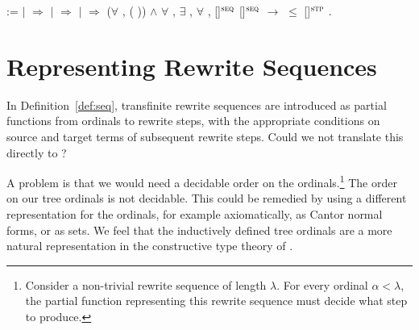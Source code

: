 \begin{singlespace}
\begin{coqdoccode}
:=\coqdoceol
\coqdocindent{1.00em}
 \coqdocvariable{$\varphi$} \coqdoceol
\coqdocindent{1.00em}
\ensuremath{|} 
\coqdocvar{\_}          \ensuremath{\Rightarrow}
\coqdoceol
\coqdocindent{1.00em}
\ensuremath{|} 
\coqdocvar{\_} \coqdocvar{\_} \coqdocvar{$\psi$} \coqdocvar{\_}
\coqdocvar{\_} \ensuremath{\Rightarrow}
\coqdocvariable{$\psi$}\coqdoceol
\coqdocindent{1.00em}
\ensuremath{|} 
\coqdocvar{\_} \coqdocvar{\_}  
\coqdocvar{\_}  \ensuremath{\Rightarrow}
(\ensuremath{\forall} ,
( )) \ensuremath{\land}\coqdoceol
\coqdocindent{2.00em}
\ensuremath{\forall} , \ensuremath{\exists}
\coqdocvar{$\iota$}, \ensuremath{\forall} \coqdocvar{$\kappa$},\coqdoceol
\coqdocindent{3.00em}
\coqdocvariable{$\varphi$}[\coqdocvariable{$\iota$}]$^\textsc{seq}$
\coqdocvariable{$\varphi$}[\coqdocvariable{$\kappa$}]$^\textsc{seq}$
\ensuremath{\rightarrow}
 $\le$
\coqdocvariable{$\varphi$}[\coqdocvariable{$\kappa$}]$^\textsc{stp}$\coqdoceol
\coqdocindent{1.00em}
.\coqdoceol
\end{coqdoccode}
\end{singlespace}



\section{Representing Rewrite Sequences}

In Definition~\ref{def:seq}, transfinite rewrite sequences are
introduced as partial functions from ordinals to rewrite steps, with
the appropriate conditions on source and target terms of subsequent
rewrite steps. Could we not translate this directly to \Coq?

A problem is that we would need a decidable order on the
ordinals.\footnote{Consider a non-trivial rewrite sequence of length
  $\lambda$. For every ordinal $\alpha < \lambda$, the partial
  function representing this rewrite sequence must decide what step to
  produce.}
The order on our tree ordinals is not decidable. This could be
remedied by using a different representation for the ordinals, for
example axiomatically, as Cantor normal forms, or as sets. We feel
that the inductively defined tree ordinals are a more natural
representation in the constructive type theory of \Coq.

